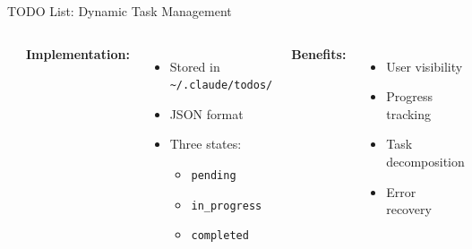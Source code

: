 \documentclass[aspectratio=169]{beamer}
\begin{document}
\begin{frame}{TODO List: Dynamic Task Management}
	\begin{columns}
		\includegraphics[width=\textwidth]{fig/TODO1.jpg}
		
		\textbf{Implementation:}
		\begin{itemize}
			\item Stored in \texttt{\~{}/.claude/todos/}
			\item JSON format
			\item Three states:
			\begin{itemize}
				\item \texttt{pending}
				\item \texttt{in\_progress}
				\item \texttt{completed}
			\end{itemize}
		\end{itemize}
		
		\textbf{Benefits:}
		\begin{itemize}
			\item User visibility
			\item Progress tracking
			\item Task decomposition
			\item Error recovery
		\end{itemize}
	\end{columns}
\end{frame}
\end{document}
